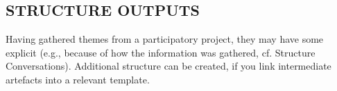 \subsection*{\normalsize{} STRUCTURE OUTPUTS{\hfill\motor}}
Having gathered themes from a participatory project, they may have
some explicit (e.g., because of how the information was gathered,
cf. {\sc Structure Conversations}).  Additional structure can be
created, if you link intermediate artefacts into a relevant template.
